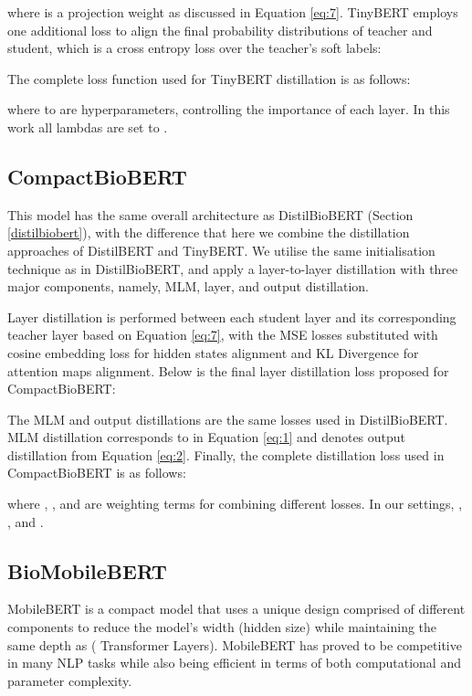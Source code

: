 \documentclass{article}
\begin{document}
where  is a projection weight as discussed in Equation \ref{eq:7}. TinyBERT employs one additional loss to align the final probability distributions of teacher and student, which is a cross entropy loss over the teacher's soft labels:



The complete loss function used for TinyBERT distillation is as follows:


where  to  are hyperparameters, controlling the importance of each layer. In this work all lambdas are set to .

\subsection{CompactBioBERT}
\label{compactbiobert} 

This model has the same overall architecture as DistilBioBERT (Section \ref{distilbiobert}), with the difference that here we combine the distillation approaches of DistilBERT and TinyBERT. We utilise the same initialisation technique as in DistilBioBERT, and apply a layer-to-layer distillation with three major components, namely, MLM, layer, and output distillation.

Layer distillation is performed between each student layer and its corresponding teacher layer based on Equation \ref{eq:7}, with the MSE losses substituted with cosine embedding loss for hidden states alignment and KL Divergence for attention maps alignment. Below is the final layer distillation loss proposed for CompactBioBERT:



The MLM and output distillations are the same losses used in DistilBioBERT. MLM distillation corresponds to  in Equation \ref{eq:1} and  denotes output distillation from Equation \ref{eq:2}. Finally, the complete distillation loss used in CompactBioBERT is as follows:


where , , and  are weighting terms for combining different losses. In our settings, , , and .

\subsection{BioMobileBERT}
MobileBERT \citep{sun-etal-2020-mobilebert} is a compact model that uses a unique design comprised of different components to reduce the model's width (hidden size) while maintaining the same depth as  ( Transformer Layers). MobileBERT has proved to be competitive in many NLP tasks while also being efficient in terms of both computational and parameter complexity.
\end{document}
